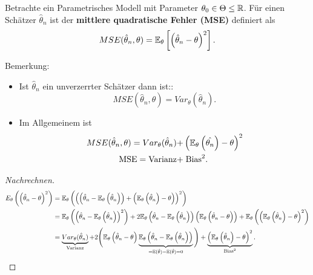 \documentclass{tstextbook}
\begin{document}
\begin{definition}
	Betrachte ein Parametrisches Modell mit Parameter $ \theta_0 \in \Theta \leq \mathbb R $. Für einen Schätzer $ \hat{\theta}_n $ ist der \textbf{mittlere quadratische Fehler (MSE)}  definiert als 
	\[
	MSE(\hat{\theta}_n, \theta )=  \mathbb E_\theta \left[ \left(\hat{\theta}_n-\theta\right)^2 \right].
	\]
\end{definition}

\begin{remark}
	Bemerkung:
	\begin{itemize}
		\item Ist $ \hat{\theta}_n $ ein unverzerrter Schätzer dann ist:: 
		\[
			MSE(\hat{\theta}_n, \theta ) =  Var_\theta(\hat{\theta}_n).
		\]
		
		\item Im Allgemeinem ist
		\[
		\begin{aligned}
		MSE(\hat{\theta}_n, \theta ) =  Var_\theta(\hat{\theta}_n) + & \left(\mathbb E_\theta \left(\hat{\theta_n}\right)-\theta \right)^2 \\
		\text{MSE}  = \text{Varianz}  + & \; \text{Bias}^2.
		\end{aligned}
		\]
	\end{itemize}
\end{remark}

\begin{proof}[Nachrechnen]
	\[
	\begin{aligned}
		E_\theta \left(\left(\hat{\theta}_n-\theta \right)^2\right) & = \mathbb E_\theta \left(\left(\left(\hat{\theta}_n -\mathbb E_\theta \left(\hat{\theta}_n \right)\right)+ \left(\mathbb E_\theta \left(\hat{\theta}_n \right)-\theta \right)\right)^2\right) \\
		& = \mathbb E_\theta \left(\left(\hat{\theta}_n -\mathbb E_\theta \left(\hat{\theta}_n \right)\right)^2 \right)
		+ 2 \mathbb E_\theta \left(\hat{\theta}_n -\mathbb E_\theta \left(\hat{\theta}_n\right) \right) \left( \mathbb E_\theta \left(\hat{\theta}_n -\theta \right)\right) 
		+  \mathbb E_\theta \left( \left(  \mathbb E_\theta \left(  \hat{\theta}_n \right)-\theta \right)^2 \right)  \\
		& = \underbrace{ Var_\theta (\hat{\theta}_n )}_{\text{Varianz}}
		+ 2 \Bigg (\mathbb E_\theta \left(\hat{\theta}_n-\theta \right)\underbrace{\mathbb E_\theta \left(\hat{\theta}_n -\mathbb E_\theta \left(\hat{\theta}_n \right)\right)}_{=\mathbb E(\hat{\theta})-\mathbb E(\hat{\theta})=0} \Bigg)
		+\underbrace{\left(\mathbb E_\theta \left(\hat{\theta}_n \right)-\theta \right)^2}_{\text{Bias}^2} .
	\end{aligned}
	\]

\end{proof}
\end{document}
